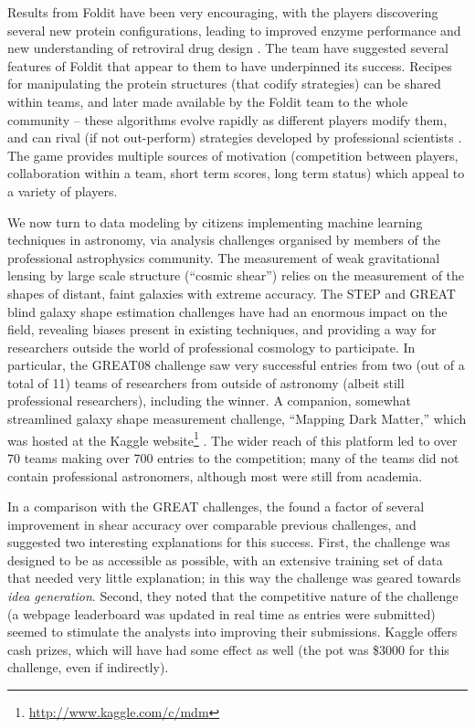 \documentclass{ar2e}
\begin{document}
Results from Foldit have been very encouraging, with the players discovering
several new protein configurations, leading to improved enzyme performance 
\citep{Eiben++2012} and new understanding of retroviral drug design
\citep{Khatib++2011a}. The team have suggested several features of Foldit that
appear to them to have underpinned its success. Recipes for manipulating the
protein structures (that codify strategies) can be shared within teams, and
later made available by the Foldit team to the whole community -- these
algorithms evolve rapidly as different players modify them, and can rival (if
not out-perform) strategies developed by professional scientists 
\citep{Khatib++2011b}. The game provides multiple sources of motivation
(competition between players, collaboration within a team, short term scores,
long term status) which appeal to a variety of players. 



We now turn to data modeling by citizens implementing machine learning
techniques in astronomy, via analysis challenges organised by members of the
professional astrophysics community. The measurement of weak gravitational
lensing by large scale structure (``cosmic shear'') relies on the measurement of
the shapes of distant, faint galaxies with extreme accuracy. The STEP
\citep{HeymansEtal2006,MasseyEtal2007} and GREAT
\citep{BridleEtal2010,KitchingEtal2012,KitchingEtal2013a} blind galaxy shape
estimation challenges have had an enormous impact on the field, revealing biases
present in existing techniques, and providing a way for researchers outside the
world of professional cosmology to participate. In particular, the GREAT08
challenge saw very successful entries from two (out of a total of 11) teams of
researchers from outside of astronomy (albeit still professional researchers),
including the winner. A companion, somewhat streamlined galaxy shape measurement
challenge, ``Mapping Dark Matter,'' which was hosted at the Kaggle
website\footnote{\url{http://www.kaggle.com/c/mdm}} \citep{KitchingEtal2013b}.
The wider reach of this platform led to over 70 teams making over 700 entries to
the competition; many of the teams did not contain professional astronomers,
although most were still from academia.

In a comparison with the GREAT challenges, the \citeauthor{KitchingEtal2013b}
found a factor of several improvement in shear accuracy over comparable previous
challenges, and suggested two interesting explanations for this success. First,
the challenge was designed to be as accessible as possible, with an extensive
training set of data that needed very little explanation; in this way the
challenge was geared towards {\it idea generation}. Second, they noted that the
competitive  nature of the challenge (a webpage leaderboard was updated in real
time as entries were submitted) seemed to stimulate the analysts into improving
their submissions. Kaggle offers cash prizes, which will have had some effect as
well (the pot was \$3000 for this challenge, even if indirectly).
\end{document}
